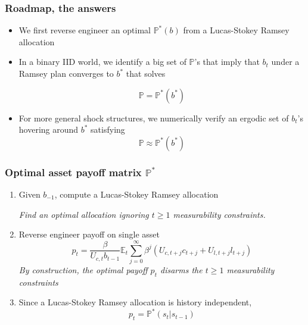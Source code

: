 \documentclass{beamer}
\newcommand{\EE}{\mathbb E}
\begin{document}
\begin{frame}
\frametitle{Roadmap, the answers}


	
	\begin{itemize}
	\item We first reverse engineer an optimal $\mathbb{P}^*(b)$ from a Lucas-Stokey  Ramsey allocation
	
	 \item In a binary IID world, we identify a big set of  $\mathbb{P}$'s that imply that $b_t$  under a Ramsey plan converges to $b^*$ that solves
	
	\[\mathbb{P}=\mathbb{P}^*(b^*)\]
	
	
	\item For more general shock structures, we numerically verify  an ergodic set of $b_t$'s hovering around $b^*$ satisfying
	\[\mathbb{P}\approx \mathbb{P}^*(b^*)\]
	
	\end{itemize}

	
\end{frame}
%
%
  \begin{frame}
\frametitle{Optimal asset payoff matrix $\mathbb{P}^*$}
\begin{enumerate}
 \item  Given $b_{-1}$, compute a Lucas-Stokey Ramsey allocation

 \emph{Find an  optimal allocation ignoring $t\geq 1$ measurability constraints.}

 \item Reverse engineer  payoff on single asset
\[
	p_t = \frac{\beta}{U_{c,t}b_{t-1}}\EE_t\sum_{j=0}^\infty\beta^j\left(U_{c,t+j}c_{t+j}+U_{l,t+j}l_{t+j}\right)
\]
\emph{By construction, the optimal payoff  $p_t$   disarms the  $t\geq 1$
measurability constraints}
\item Since a Lucas-Stokey Ramsey allocation is  history independent,
\[p_t=\mathbb{P}^*(s_t|s_{t-1})\]
\end{enumerate}
\end{frame}
\end{document}
